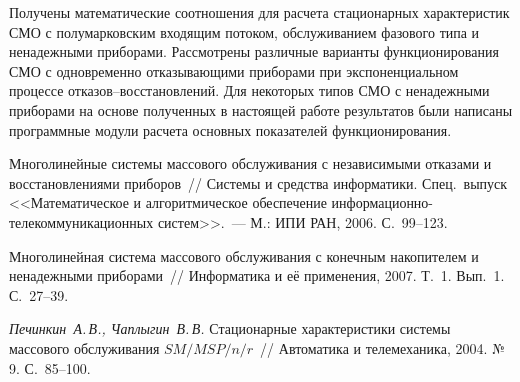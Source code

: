 \begin{multicols}{2}
Получены математические соотношения для расчета
стационарных характеристик СМО с полумарковским входящим потоком,
обслуживанием фазового типа и ненадежными приборами.
Рассмотрены различные варианты функционирования СМО с одновременно
отказывающими приборами при экспоненциальном процессе
отказов--вос\-ста\-нов\-ле\-ний.
Для некоторых типов СМО с ненадежными приборами на основе полученных
в настоящей работе результатов были написаны программные модули расчета
основных показателей функционирования.

{\small\frenchspacing
{%
\begin{thebibliography}{9}
Многолинейные системы массового обслуживания с неза\-ви\-си\-мы\-ми
отказами и восстановлениями приборов~//
Системы и средства информатики.
Спец.\ выпуск <<Математическое и алгоритмическое обеспечение
информационно-телекоммуникационных сис\-тем>>.~---
М.: ИПИ РАН, 2006. С.~99--123.

Многолинейная система массового обслуживания с конечным
накопителем и ненадежными приборами~//
Информатика и её применения, 2007. Т.~1. Вып.~1. С.~27--39.

{\it Печинкин~А.\,В., Чаплыгин~В.\,В.}
Стационарные характеристики системы массового обслуживания $SM/MSP/n/r$~//
Автоматика и телемеханика, 2004. №\,9. С.~85--100.
\end{thebibliography}

}
}

\end{multicols}


\label{end\stat}